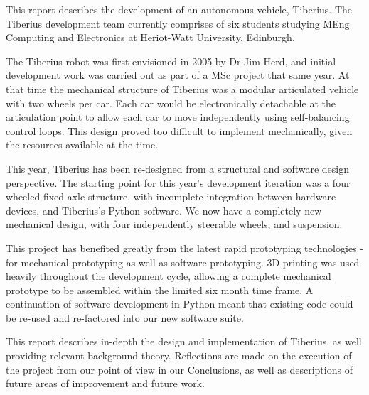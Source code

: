 \newline
This report describes the development of an autonomous vehicle, Tiberius. The Tiberius development team currently comprises of six students studying MEng Computing and Electronics at Heriot-Watt University, Edinburgh.
\newline

The Tiberius robot was first envisioned in 2005 by Dr Jim Herd, and initial development work was carried out as part of a MSc project that same year. At that time the mechanical structure of Tiberius was a modular articulated vehicle with two wheels per car. Each car would be electronically detachable at the articulation point to allow each car to move independently using self-balancing control loops. This design proved too difficult to implement mechanically, given the resources available at the time.
\newline

This year, Tiberius has been re-designed from a structural and software design perspective. The starting point for this year's development iteration was a four wheeled fixed-axle structure, with incomplete integration between hardware devices, and Tiberius's Python software. We now have a completely new mechanical design, with four independently steerable wheels, and suspension.
\newline

This project has benefited greatly from the latest rapid prototyping technologies - for mechanical prototyping as well as software prototyping. 3D printing was used heavily throughout the development cycle, allowing a complete mechanical prototype to be assembled within the limited six month time frame. A continuation of software development in Python meant that existing code could be re-used and re-factored into our new software suite.

This report describes in-depth the design and implementation of Tiberius, as well providing relevant background theory. Reflections are made on the execution of the project from our point of view in our Conclusions, as well as descriptions of future areas of improvement and future work.

\pagebreak
